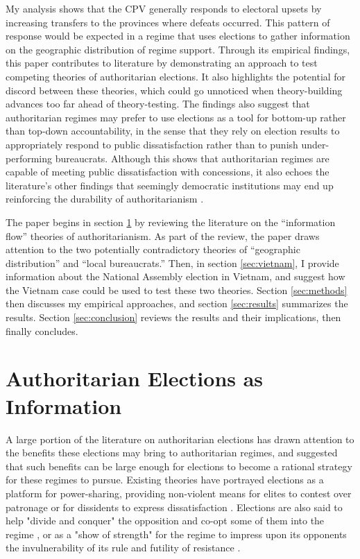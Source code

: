 \documentclass[12pt]{article}\usepackage[]{graphicx}\usepackage[]{color}
\newcommand{\1}{\mathbbm{1}}
\begin{document}
My analysis shows that the CPV generally responds to electoral upsets by increasing transfers to the provinces where defeats occurred. This pattern of response would be expected in a regime that uses elections to gather information on the geographic distribution of regime support. Through its empirical findings, this paper contributes to literature by demonstrating an approach to test competing theories of authoritarian elections. It also highlights the potential for discord between these theories, which could go unnoticed when theory-building advances too far ahead of theory-testing. The findings also suggest that authoritarian regimes may prefer to use elections as a tool for bottom-up rather than top-down accountability, in the sense that they rely on election results to appropriately respond to public dissatisfaction rather than to punish under-performing bureaucrats. Although this shows that authoritarian regimes are capable of meeting public dissatisfaction with concessions, it also echoes the literature's other findings that seemingly democratic institutions may end up reinforcing the durability of authoritarianism \citep[e.g.][]{BoixSvolik2013, GandhiPrzeworski2007}.

The paper begins in section \ref{sec:info} by reviewing the literature on the ``information flow'' theories of authoritarianism. As part of the review, the paper draws attention to the two potentially contradictory theories of ``geographic distribution'' and ``local bureaucrats.'' Then, in section \ref{sec:vietnam}, I provide information about the National Assembly election in Vietnam, and suggest how the Vietnam case could be used to test these two theories. Section \ref{sec:methods} then discusses my empirical approaches, and section \ref{sec:results} summarizes the results. Section \ref{sec:conclusion} reviews the results and their implications, then finally concludes.


\section{Authoritarian Elections as Information}
\label{sec:info}
A large portion of the literature on authoritarian elections has drawn attention to the benefits these elections may bring to authoritarian regimes, and suggested that such benefits can be large enough for elections to become a rational strategy for these regimes to pursue. Existing theories have portrayed elections as a platform for power-sharing, providing non-violent means for elites to contest over patronage \citep{LustOkar2006} or for dissidents to express dissatisfaction \citep{AR2005}. Elections are also said to help "divide and conquer" the opposition and co-opt some of them into the regime \citep{LustOkar2005}, or as a "show of strength" for the regime to impress upon its opponents the invulnerability of its rule and futility of resistance \citep{Geddes2005}. 
\end{document}
